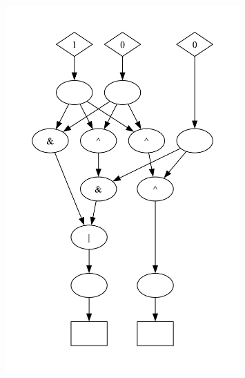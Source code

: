 \begin{figure}[H]
    \centering
    \begin{minipage}{0.49\textwidth}
        \includegraphics[width=0.8\textwidth]{figures/adder_1_bit.png}
    \end{minipage}
    \begin{minipage}{0.49\textwidth}

\end{minipage}
\end{figure}
